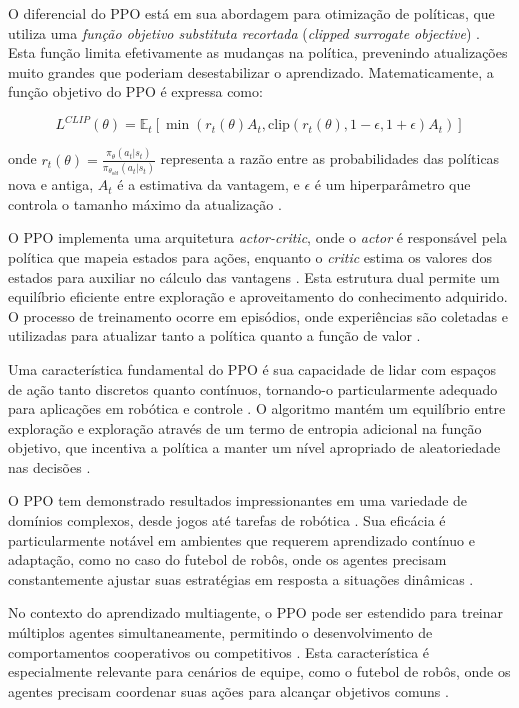 O diferencial do PPO está em sua abordagem para otimização de políticas, que utiliza uma \textit{função objetivo substituta recortada} (\textit{clipped surrogate objective}) \cite{PPO} \cite{openia_ppo_doc}. Esta função limita efetivamente as mudanças na política, prevenindo atualizações muito grandes que poderiam desestabilizar o aprendizado. Matematicamente, a função objetivo do PPO é expressa como:

\begin{equation}
L^{CLIP}(\theta) = \mathbb{E}_t \left[ \min\left( r_t(\theta) A_t, \text{clip}(r_t(\theta), 1-\epsilon, 1+\epsilon) A_t \right) \right]
\end{equation}

onde $r_t(\theta) = \frac{\pi_\theta(a_t|s_t)}{\pi_{\theta_{old}}(a_t|s_t)}$ representa a razão entre as probabilidades das políticas nova e antiga, $A_t$ é a estimativa da vantagem, e $\epsilon$ é um hiperparâmetro que controla o tamanho máximo da atualização \cite{stable_baselines3} \cite{PPO}.

O PPO implementa uma arquitetura \textit{actor-critic}, onde o \textit{actor} é responsável pela política que mapeia estados para ações, enquanto o \textit{critic} estima os valores dos estados para auxiliar no cálculo das vantagens \cite{PPO} \cite{pytorch_ppo}. Esta estrutura dual permite um equilíbrio eficiente entre exploração e aproveitamento do conhecimento adquirido. O processo de treinamento ocorre em episódios, onde experiências são coletadas e utilizadas para atualizar tanto a política quanto a função de valor \cite{PPO}.

Uma característica fundamental do PPO é sua capacidade de lidar com espaços de ação tanto discretos quanto contínuos, tornando-o particularmente adequado para aplicações em robótica e controle \cite{sutton} \cite{PPO}. O algoritmo mantém um equilíbrio entre exploração e exploração através de um termo de entropia adicional na função objetivo, que incentiva a política a manter um nível apropriado de aleatoriedade nas decisões \cite{PPO}.

O PPO tem demonstrado resultados impressionantes em uma variedade de domínios complexos, desde jogos até tarefas de robótica \cite{ppo_env_gym}. Sua eficácia é particularmente notável em ambientes que requerem aprendizado contínuo e adaptação, como no caso do futebol de robôs, onde os agentes precisam constantemente ajustar suas estratégias em resposta a situações dinâmicas \cite{bruno_brandao}.

No contexto do aprendizado multiagente, o PPO pode ser estendido para treinar múltiplos agentes simultaneamente, permitindo o desenvolvimento de comportamentos cooperativos ou competitivos \cite{pytorch_ppo}. Esta característica é especialmente relevante para cenários de equipe, como o futebol de robôs, onde os agentes precisam coordenar suas ações para alcançar objetivos comuns \cite{ppo_env_gym} \cite{bruno_brandao}.


